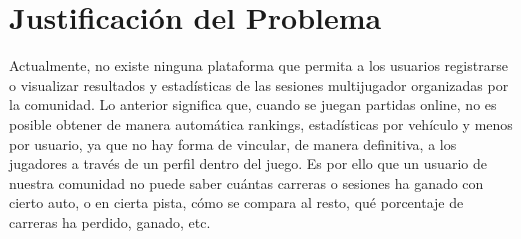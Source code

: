 \section{Justificación del Problema}
Actualmente, no existe ninguna plataforma que permita a los usuarios registrarse o visualizar resultados y estadísticas de las sesiones multijugador organizadas por la comunidad. Lo anterior significa que, cuando se juegan partidas online, no es posible obtener de manera automática rankings, estadísticas por vehículo y menos por usuario, ya que no hay forma de vincular, de manera definitiva, a los jugadores a través de un perfil dentro del juego. Es por ello que un usuario de nuestra comunidad no puede saber cuántas carreras o sesiones ha ganado con cierto auto, o en cierta pista, cómo se compara al resto, qué porcentaje de carreras ha perdido, ganado, etc.
